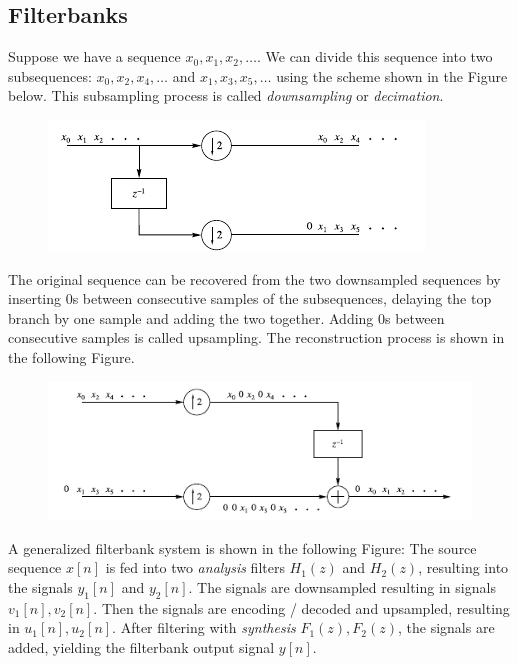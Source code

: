 \subsection{Filterbanks}

Suppose we have a sequence $x_0, x_1, x_2 , \ldots$. We can divide this sequence into two subsequences: $x_0, x_2, x_4, \ldots$ and $x_1, x_3, x_5, \ldots$ using the scheme shown in the Figure below. This subsampling process is called \emph{downsampling} or \emph{decimation}.

\begin{figure}[H]
    \centering
    \includegraphics[scale=0.6]{images/2021-11-09-subband_02.png}
\end{figure}



The original sequence can be recovered from the two downsampled sequences by inserting $0$s between consecutive samples of the subsequences, delaying the top branch by one sample and adding the two together. Adding $0$s between consecutive samples is called upsampling. The reconstruction process is shown in the following Figure.

\begin{figure}[H]
    \centering
    \includegraphics[scale=0.6]{images/2021-11-09-subband_03.png}
\end{figure}


A generalized filterbank system is shown in the following Figure: The source sequence $x[n]$ is fed into two \emph{analysis} filters $H_1(z)$ and $H_2(z)$, resulting into the signals $y_1[n]$ and $y_2[n]$. The signals are downsampled resulting in signals $v_1[n], v_2[n]$. Then the signals are encoding / decoded and upsampled, resulting in $u_1[n], u_2[n]$. After filtering with \emph{synthesis} $F_1(z), F_2(z)$, the signals are added, yielding the filterbank output signal $y[n]$.

